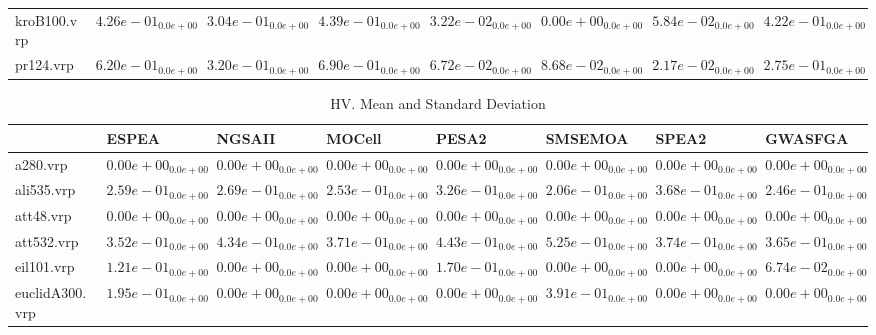 \documentclass{article}
\begin{document}
\begin{table}
\begin{scriptsize}
\begin{tabular}{llllllll}
kroB100.vrp & $  4.26e-01_{ 0.0e+00}$ & $  3.04e-01_{ 0.0e+00}$ & $  4.39e-01_{ 0.0e+00}$ & \cellcolor{gray25}$  3.22e-02_{ 0.0e+00}$ & \cellcolor{gray95}$  0.00e+00_{ 0.0e+00}$ & $  5.84e-02_{ 0.0e+00}$ & $  4.22e-01_{ 0.0e+00}$ \\
pr124.vrp & $  6.20e-01_{ 0.0e+00}$ & $  3.20e-01_{ 0.0e+00}$ & $  6.90e-01_{ 0.0e+00}$ & \cellcolor{gray25}$  6.72e-02_{ 0.0e+00}$ & $  8.68e-02_{ 0.0e+00}$ & \cellcolor{gray95}$  2.17e-02_{ 0.0e+00}$ & $  2.75e-01_{ 0.0e+00}$ \\
\hline
\end{tabular}
\end{scriptsize}
\end{table}

\begin{table}
\caption{HV. Mean and Standard Deviation}
\label{table: HV}
\centering
\begin{scriptsize}
\begin{tabular}{llllllll}
\hline & ESPEA & NGSAII & MOCell & PESA2 & SMSEMOA & SPEA2 &  GWASFGA\\
\hline 
a280.vrp & $  0.00e+00_{ 0.0e+00}$ & $  0.00e+00_{ 0.0e+00}$ & $  0.00e+00_{ 0.0e+00}$ & $  0.00e+00_{ 0.0e+00}$ & $  0.00e+00_{ 0.0e+00}$ & $  0.00e+00_{ 0.0e+00}$ & $  0.00e+00_{ 0.0e+00}$ \\
ali535.vrp & $  2.59e-01_{ 0.0e+00}$ & $  2.69e-01_{ 0.0e+00}$ & $  2.53e-01_{ 0.0e+00}$ & \cellcolor{gray25}$  3.26e-01_{ 0.0e+00}$ & $  2.06e-01_{ 0.0e+00}$ & \cellcolor{gray95}$  3.68e-01_{ 0.0e+00}$ & $  2.46e-01_{ 0.0e+00}$ \\
att48.vrp & $  0.00e+00_{ 0.0e+00}$ & $  0.00e+00_{ 0.0e+00}$ & $  0.00e+00_{ 0.0e+00}$ & $  0.00e+00_{ 0.0e+00}$ & $  0.00e+00_{ 0.0e+00}$ & $  0.00e+00_{ 0.0e+00}$ & $  0.00e+00_{ 0.0e+00}$ \\
att532.vrp & $  3.52e-01_{ 0.0e+00}$ & $  4.34e-01_{ 0.0e+00}$ & $  3.71e-01_{ 0.0e+00}$ & \cellcolor{gray25}$  4.43e-01_{ 0.0e+00}$ & \cellcolor{gray95}$  5.25e-01_{ 0.0e+00}$ & $  3.74e-01_{ 0.0e+00}$ & $  3.65e-01_{ 0.0e+00}$ \\
eil101.vrp & \cellcolor{gray25}$  1.21e-01_{ 0.0e+00}$ & $  0.00e+00_{ 0.0e+00}$ & $  0.00e+00_{ 0.0e+00}$ & \cellcolor{gray95}$  1.70e-01_{ 0.0e+00}$ & $  0.00e+00_{ 0.0e+00}$ & $  0.00e+00_{ 0.0e+00}$ & $  6.74e-02_{ 0.0e+00}$ \\
euclidA300.vrp & \cellcolor{gray25}$  1.95e-01_{ 0.0e+00}$ & $  0.00e+00_{ 0.0e+00}$ & $  0.00e+00_{ 0.0e+00}$ & $  0.00e+00_{ 0.0e+00}$ & \cellcolor{gray95}$  3.91e-01_{ 0.0e+00}$ & $  0.00e+00_{ 0.0e+00}$ & $  0.00e+00_{ 0.0e+00}$ \\

\end{tabular}
\end{scriptsize}
\end{table}
\end{document}
